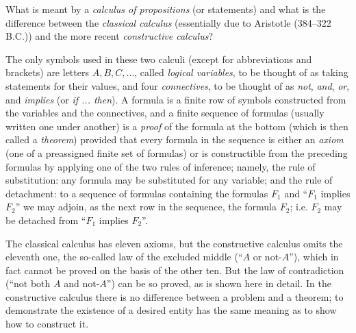 
\begin{sourcebox}
What is meant by a \emph{calculus of propositions} (or statements) and what is the difference between the \emph{classical calculus} (essentially due to Aristotle (384--322 B.C.)) and the more recent \emph{constructive calculus}?

The only symbols used in these two calculi (except for abbreviations and brackets) are letters $A,B,C,\ldots$, called \emph{logical variables}, to be thought of as taking statements for their values, and four \emph{connectives}, to be thought of as \emph{not}, \emph{and}, \emph{or}, and \emph{implies} (or \emph{if ... then}). A formula is a finite row of symbols constructed from the variables and the connectives, and a finite sequence of formulas (usually written one under another) is a \emph{proof} of the formula at the bottom (which is then called a \emph{theorem}) provided that every formula in the sequence is either an \emph{axiom} (one of a preassigned finite set of formulas) or is constructible from the preceding formulas by applying one of the two rules of inference; namely, the rule of substitution: any formula may be substituted for any variable; and the rule of detachment: to a sequence of formulas containing the formulas $F_1$ and ``$F_1$ implies $F_2$'' we may adjoin, as the next row in the sequence, the formula $F_2$; i.e. $F_2$ may be detached from ``$F_1$ implies $F_2$''.

The classical calculus has eleven axioms, but the constructive calculus omits the eleventh one, the so-called law of the excluded middle (``$A$ or not-$A$''), which in fact cannot be proved on the basis of the other ten. But the law of contradiction (``not both $A$ and not-$A$'') can be so proved, as is shown here in detail. In the constructive calculus there is no difference between a problem and a theorem; to demonstrate the existence of a desired entity has the same meaning as to show how to construct it.
\end{sourcebox}

